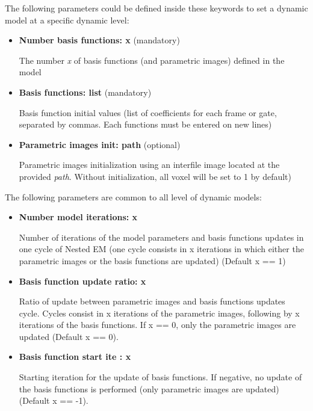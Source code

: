 \documentclass[a4paper, 11pt]{article}
\begin{document}
The following parameters could be defined inside these keywords to set a dynamic model at a specific dynamic level:
\begin{itemize}

\item \textbf{Number basis functions: x}	(mandatory) 

The number \textit{x} of basis functions (and parametric images) defined in the model

\item \textbf{Basis functions: list}	(mandatory)
 
Basis function initial values (list of coefficients for each frame or gate, separated by commas. Each functions must be entered on new lines)

\item \textbf{Parametric images init: path} (optional) 

Parametric images initialization using an interfile image located at the provided \textit{path}. Without initialization, all voxel will be set to 1 by default)

\end{itemize}


\bigskip
The following parameters are common to all level of dynamic models:


\begin{itemize}
\item \textbf{Number model iterations: x}	

Number of iterations of the model parameters and basis functions updates in one cycle of Nested EM (one cycle consists in x iterations in which either the parametric images or the basis functions are updated) (Default x ==  1)
   
\item \textbf{Basis function update ratio: x}	

Ratio of update between parametric images and basis functions updates cycle. Cycles consist in x iterations of the parametric images, following by x iterations of the basis functions. If x == 0, only the parametric images are updated (Default x ==  0).
          
\item \textbf{Basis function start ite : x}	

Starting iteration for the update of basis functions. If negative, no update of the basis functions is performed (only parametric images are updated) (Default x == -1).                                                                        
\end{itemize}
\end{document}
